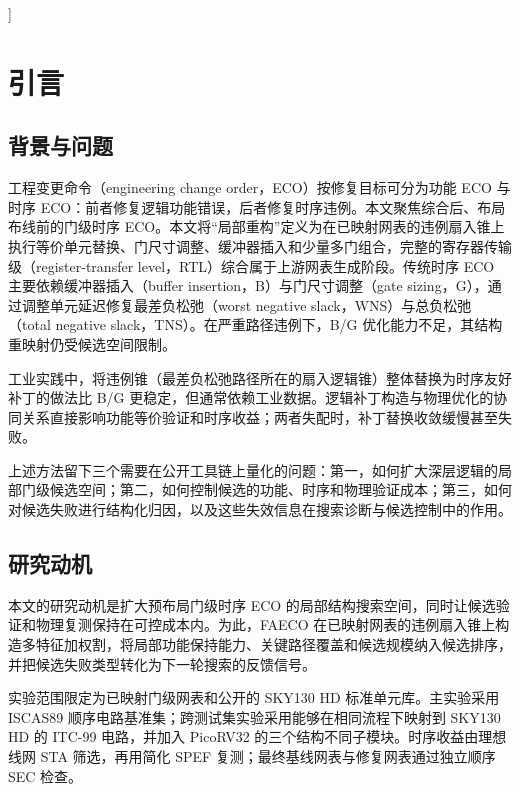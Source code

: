 \documentclass[twocolumn,10pt,fontset=windows]{ctexart}
\begin{document}
]%


\section{引言}

\subsection{背景与问题}
工程变更命令（engineering change order，ECO）按修复目标可分为功能 ECO 与时序 ECO：前者修复逻辑功能错误，后者修复时序违例。本文聚焦综合后、布局布线前的门级时序 ECO。本文将“局部重构”定义为在已映射网表的违例扇入锥上执行等价单元替换、门尺寸调整、缓冲器插入和少量多门组合，完整的寄存器传输级（register-transfer level，RTL）综合属于上游网表生成阶段。传统时序 ECO 主要依赖缓冲器插入（buffer insertion，B）与门尺寸调整（gate sizing，G），通过调整单元延迟修复最差负松弛（worst negative slack，WNS）与总负松弛（total negative slack，TNS）。在严重路径违例下，B/G 优化能力不足，其结构重映射仍受候选空间限制\cite{ho2010eco,liu2021rlsizer,chen2024aito}。

工业实践中，将违例锥（最差负松弛路径所在的扇入逻辑锥）整体替换为时序友好补丁的做法比 B/G 更稳定，但通常依赖工业数据。逻辑补丁构造与物理优化的协同关系直接影响功能等价验证和时序收益；两者失配时，补丁替换收敛缓慢甚至失败。

上述方法留下三个需要在公开工具链上量化的问题：第一，如何扩大深层逻辑的局部门级候选空间；第二，如何控制候选的功能、时序和物理验证成本；第三，如何对候选失败进行结构化归因，以及这些失效信息在搜索诊断与候选控制中的作用。
\subsection{研究动机}
本文的研究动机是扩大预布局门级时序 ECO 的局部结构搜索空间，同时让候选验证和物理复测保持在可控成本内。为此，FAECO 在已映射网表的违例扇入锥上构造多特征加权割，将局部功能保持能力、关键路径覆盖和候选规模纳入候选排序，并把候选失败类型转化为下一轮搜索的反馈信号。

实验范围限定为已映射门级网表和公开的 SKY130 HD 标准单元库。主实验采用 ISCAS89 顺序电路基准集\cite{iscas89}；跨测试集实验采用能够在相同流程下映射到 SKY130 HD 的 ITC-99 电路\cite{itc99}，并加入 PicoRV32 的三个结构不同子模块\cite{picorv32}。时序收益由理想线网 STA 筛选，再用简化 SPEF 复测；最终基线网表与修复网表通过独立顺序 SEC 检查。
\end{document}
